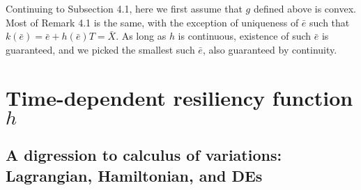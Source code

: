 \documentclass[openany,oneside]{article}
\theoremstyle{definition}
\theoremstyle{remark}
\begin{document}
Continuing to Subsection 4.1, here we first assume that $g$ defined above is convex. Most of Remark 4.1 is the same, with the exception of uniqueness of $\bar{e}$ such that $k(\bar{e}) = \bar{e} + h(\bar{e}) T = \bar{X}$. As long as $h$ is continuous, existence of such $\bar{e}$ is guaranteed, and we picked the smallest such $\bar{e}$, also guaranteed by continuity.





\section{Time-dependent resiliency function $h$}

\subsection{A digression to calculus of variations: Lagrangian, Hamiltonian, and DEs}



{}

\end{document}
